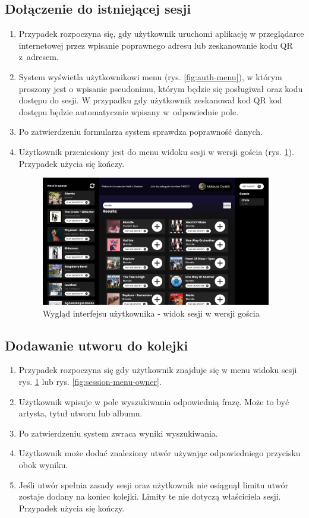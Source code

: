 \subsection{Dołączenie do istniejącej sesji}
\begin{enumerate}
\item Przypadek rozpoczyna się, gdy użytkownik uruchomi aplikację w przeglądarce internetowej przez wpisanie poprawnego adresu lub zeskanowanie kodu QR z~adresem.
\item System wyświetla użytkownikowi menu (rys. \ref{fig:auth-menu}), w którym proszony jest o wpisanie pseudonimu, którym będzie się posługiwał oraz kodu dostępu do sesji. W przypadku gdy użytkownik zeskanował kod QR kod dostępu będzie automatycznie wpisany w~odpowiednie pole.
\item Po zatwierdzeniu formularza system sprawdza poprawność danych.
\item Użytkownik przeniesiony jest do menu widoku sesji w wersji gościa (rys. \ref{fig:session-menu-guest}). Przypadek użycia się kończy.
\begin{figure}[h]
\centering
\includegraphics[width=0.95\textwidth]{./graf/guest_session_menu.PNG}
\caption{Wygląd interfejsu użytkownika - widok sesji w wersji gościa}
\label{fig:session-menu-guest}
\end{figure}
\end{enumerate}

\subsection{Dodawanie utworu do kolejki}
\begin{enumerate}
\item Przypadek rozpoczyna się gdy użytkownik znajduje się w menu widoku sesji rys. \ref{fig:session-menu-guest} lub rys. \ref{fig:session-menu-owner}.
\item Użytkownik wpisuje w pole wyszukiwania odpowiednią frazę. Może to być artysta, tytuł utworu lub albumu.
\item Po zatwierdzeniu system zwraca wyniki wyszukiwania.
\item Użytkownik może dodać znaleziony utwór używając odpowiedniego przycisku obok wyniku.
\item Jeśli utwór spełnia zasady sesji oraz użytkownik nie osiągnął limitu utwór zostaje dodany na koniec kolejki. Limity te nie dotyczą właściciela sesji. Przypadek użycia się kończy.
\end{enumerate}

